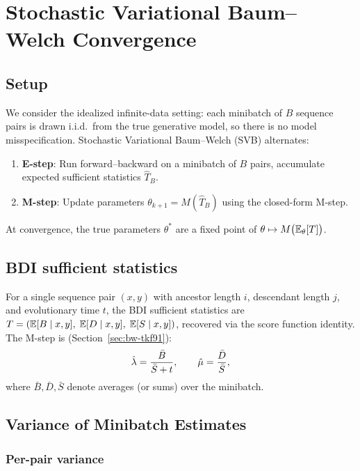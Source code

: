 \section{Stochastic Variational Baum--Welch Convergence}
\label{sec:svb-convergence}

\subsection{Setup}

We consider the idealized infinite-data setting:
each minibatch of $B$ sequence pairs is drawn i.i.d.\ from the
true generative model, so there is no model misspecification.
Stochastic Variational Baum--Welch (SVB) alternates:
\begin{enumerate}
\item \textbf{E-step}: Run forward--backward on a minibatch of $B$ pairs,
  accumulate expected sufficient statistics $\hat T_B$.
\item \textbf{M-step}: Update parameters $\theta_{k+1} = M(\hat T_B)$
  using the closed-form M-step.
\end{enumerate}
At convergence, the true parameters $\theta^*$ are a fixed point of
$\theta \mapsto M\bigl(\mathbb{E}_{\theta}[T]\bigr)$.

\subsection{BDI sufficient statistics}

For a single sequence pair $(x,y)$ with ancestor length $i$, descendant
length $j$, and evolutionary time $t$, the BDI sufficient statistics are
$T = (\mathbb{E}[B \mid x,y],\; \mathbb{E}[D \mid x,y],\; \mathbb{E}[S \mid x,y])$,
recovered via the score function identity.
The M-step is (Section~\ref{sec:bw-tkf91}):
\begin{equation}\label{eq:mstep}
\hat{\lambda} = \frac{\bar B}{\bar S + t},
\qquad
\hat{\mu} = \frac{\bar D}{\bar S},
\end{equation}
where $\bar B, \bar D, \bar S$ denote averages (or sums) over the minibatch.

\subsection{Variance of Minibatch Estimates}

\subsubsection{Per-pair variance}

